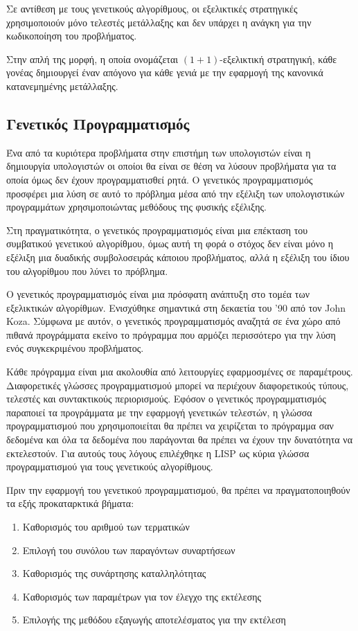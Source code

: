 Σε αντίθεση με τους γενετικούς αλγορίθμους, οι εξελικτικές στρατηγικές χρησιμοποιούν μόνο τελεστές μετάλλαξης και δεν υπάρχει η ανάγκη για την κωδικοποίηση του προβλήματος.

Στην απλή της μορφή, η οποία ονομάζεται $(1+1)$-εξελικτική στρατηγική, κάθε γονέας δημιουργεί έναν απόγονο για κάθε γενιά με την εφαρμογή της κανονικά κατανεμημένης μετάλλαξης.
\subsection{Γενετικός Προγραμματισμός}

Ένα από τα κυριότερα προβλήματα στην επιστήμη των υπολογιστών είναι η δημιουργία υπολογιστών οι οποίοι θα είναι σε θέση να λύσουν προβλήματα για τα οποία όμως δεν έχουν προγραμματισθεί ρητά. Ο γενετικός προγραμματισμός προσφέρει μια λύση σε αυτό το πρόβλημα μέσα από την εξέλιξη των υπολογιστικών προγραμμάτων χρησιμοποιώντας μεθόδους της φυσικής εξέλιξης.

Στη πραγματικότητα, ο γενετικός προγραμματισμός είναι μια επέκταση του συμβατικού γενετικού αλγορίθμου, όμως αυτή τη φορά ο στόχος δεν είναι μόνο η εξέλιξη μια δυαδικής συμβολοσειράς κάποιου προβλήματος, αλλά η εξέλιξη του ίδιου του αλγορίθμου που λύνει το πρόβλημα.

Ο γενετικός προγραμματισμός είναι μια πρόσφατη ανάπτυξη στο τομέα των εξελικτικών αλγορίθμων. Ενισχύθηκε σημαντικά στη δεκαετία του '90 από τον John Koza.
Σύμφωνα με αυτόν, ο γενετικός προγραμματισμός αναζητά σε ένα χώρο από πιθανά προγράμματα εκείνο το πρόγραμμα που αρμόζει περισσότερο για την λύση ενός συγκεκριμένου προβλήματος.

Κάθε πρόγραμμα είναι μια ακολουθία από λειτουργίες εφαρμοσμένες σε παραμέτρους. Διαφορετικές γλώσσες προγραμματισμού μπορεί να περιέχουν διαφορετικούς τύπους, τελεστές και συντακτικούς περιορισμούς. Εφόσον ο γενετικός προγραμματισμός παραποιεί τα προγράμματα με την εφαρμογή γενετικών τελεστών, η γλώσσα προγραμματισμού που χρησιμοποιείται θα πρέπει να χειρίζεται το πρόγραμμα σαν δεδομένα και όλα τα δεδομένα που παράγονται θα πρέπει να έχουν την δυνατότητα να εκτελεστούν. Για αυτούς τους λόγους επιλέχθηκε η LISP ως κύρια γλώσσα προγραμματισμού για τους γενετικούς αλγορίθμους.

Πριν την εφαρμογή του γενετικού προγραμματισμού, θα πρέπει να πραγματοποιηθούν τα εξής προκαταρκτικά βήματα:

\begin{enumerate}
  \item Καθορισμός του αριθμού των τερματικών
  \item Επιλογή του συνόλου των παραγόντων συναρτήσεων
  \item Καθορισμός της συνάρτησης καταλληλότητας
  \item Καθορισμός των παραμέτρων για τον έλεγχο της εκτέλεσης
  \item Επιλογής της μεθόδου εξαγωγής αποτελέσματος για την εκτέλεση
\end{enumerate}

